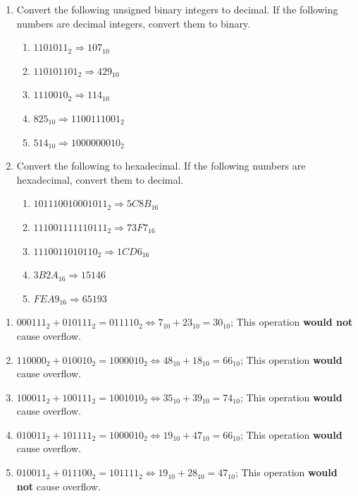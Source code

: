 \documentclass{homework}
\begin{document}
\renewcommand{\theenumi}{\Alph{enumi}}
\begin{enumerate}
\item Convert the following unsigned binary integers to decimal. If the following numbers are decimal integers, convert them to binary.

\begin{enumerate}
\item $1101011_2 \Rightarrow 107_{10}$
\item $110101101_2 \Rightarrow 429_{10}$
\item $1110010_2 \Rightarrow 114_{10}$
\item $825_{10} \Rightarrow 1100111001_2$
\item $514_{10} \Rightarrow 1000000010_2$
\end{enumerate}

\item Convert the following to hexadecimal. If the following numbers are hexadecimal, convert them to decimal.

\begin{enumerate}
\item $101110010001011_2 \Rightarrow 5C8B_{16}$
\item $111001111110111_2 \Rightarrow 73F7_{16}$
\item $1110011010110_2 \Rightarrow 1CD6_{16}$
\item $3B2A_{16} \Rightarrow 15146$
\item $FEA9_{16} \Rightarrow 65193$
\end{enumerate}
\end{enumerate}


\renewcommand{\theenumi}{\alph{enumi}}
\begin{enumerate}
\item $000111_2 + 010111_2 = 011110_2 \Leftrightarrow 7_{10} + 23_{10} = 30_{10}$; This operation \textbf{would not} cause overflow.
\item $110000_2 + 010010_2 = 1000010_2 \Leftrightarrow 48_{10} + 18_{10} = 66_{10}$; This operation \textbf{would} cause overflow.
\item $100011_2 + 100111_2 = 1001010_2 \Leftrightarrow 35_{10} + 39_{10} = 74_{10}$; This operation \textbf{would} cause overflow.
\item $010011_2 + 101111_2 = 1000010_2 \Leftrightarrow 19_{10} + 47_{10} = 66_{10}$; This operation \textbf{would} cause overflow.
\item $010011_2 + 011100_2 = 101111_2 \Leftrightarrow 19_{10} + 28_{10} =47_{10}$; This operation \textbf{would not} cause overflow.
\end{enumerate}
\end{document}
